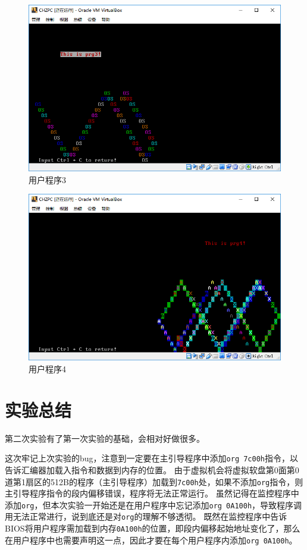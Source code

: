 \documentclass[logo,reportComp]{thesis}
\begin{document}
\begin{figure}[H]
\centering
\includegraphics[width=\linewidth]{fig/prg3.PNG}
\caption{用户程序3}
\label{fig:3}
\end{figure}
\begin{figure}[H]
\centering
\includegraphics[width=\linewidth]{fig/prg4.PNG}
\caption{用户程序4}
\label{fig:4}
\end{figure}

\section{实验总结}

第二次实验有了第一次实验的基础，会相对好做很多。

这次牢记上次实验的bug，注意到一定要在主引导程序中添加\verb'org 7c00h'指令，以告诉汇编器加载入指令和数据到内存的位置。
由于虚拟机会将虚拟软盘第0面第0道第1扇区的512B的程序（主引导程序）加载到\verb'7c00h'处，如果不添加\verb'org'指令，则主引导程序指令的段内偏移错误，程序将无法正常运行。
虽然记得在监控程序中添加\verb'org'，但本次实验一开始还是在用户程序中忘记添加\verb'org 0A100h'，导致程序调用无法正常进行，说到底还是对\verb'org'的理解不够透彻。
既然在监控程序中告诉BIOS将用户程序需加载到内存\verb'0A100h'的位置，即段内偏移起始地址变化了，那么在用户程序中也需要声明这一点，因此才要在每个用户程序内添加\verb'org 0A100h'。
\end{document}
